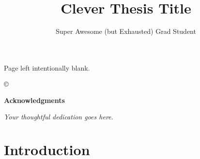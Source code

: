 \documentclass[plain]{hvdthesis}
\author{Super Awesome (but Exhausted) Grad Student }
\title{Clever Thesis Title}
\begin{document}


\clearpage
\thispagestyle{empty}
\begin{center}
\vspace*{\fill}
Page left intentionally blank.
\vspace*{\fill}
\end{center}

\frontmatter

\makecover
\copyright

%
{\singlespace
\tableofcontents
}
\newpage
\clearpage


\newpage
%
\thispagestyle{plain}

\vskip 0.5cm
{\centerline {\Large \bf Acknowledgments}}
\vskip 0.5cm
\normalsize




\clearpage
%
\thispagestyle{plain}

\vspace*{\fill}
{\centerline {\em Your thoughtful dedication goes here.}}
\vspace*{\fill}


\mainmatter
\pagestyle{fancy}


%
%

\chapter[Introduction]{Introduction}\label{c:intro}

\clearpage
%
\end{document}

